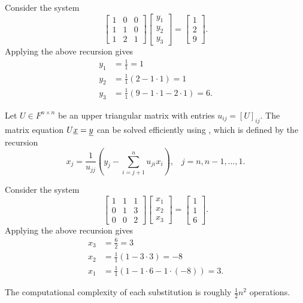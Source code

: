\begin{example}
Consider the system
\begin{equation*}
\left[ \begin{array}{ccc} 1 & 0 & 0 \\ 1 & 1 & 0 \\ 1 & 2 & 1 \end{array} \right]
\left[ \begin{array}{c} y_1 \\ y_2 \\ y_3 \end{array} \right]
 = \left[ \begin{array}{c} 1 \\ 2 \\ 9 \end{array} \right].
\end{equation*}
Applying the above recursion gives
\begin{align*}
y_1 & = \frac{1}{1}  = 1 \\
y_2 & = \frac{1}{1} (2 - 1\cdot 1)  = 1 \\
y_3 & = \frac{1}{1} (9 - 1\cdot 1 - 2\cdot 1) = 6.
\end{align*}
\end{example}

Let $U \in F^{n \times n}$ be an upper triangular matrix with entries $u_{ij} = [ U ]_{ij}$.
The matrix equation $U \underline{x} = \underline{y}$ can be solved efficiently using , which is defined by the recursion
\begin{equation*}
x_j = \frac{1}{u_{jj}} \left( y_j - \sum_{i=j+1}^{n} u_{ji} x_i \right), \;\;\; j=n,n-1,\ldots,1.
\end{equation*}

\begin{example}
Consider the system
\begin{equation*}
\left[ \begin{array}{ccc} 1 & 1 & 1 \\ 0 & 1 & 3 \\ 0 & 0 & 2 \end{array} \right]
\left[ \begin{array}{c} x_1 \\ x_2 \\ x_3 \end{array} \right]
 = \left[ \begin{array}{c} 1 \\ 1 \\ 6 \end{array} \right].
\end{equation*}
Applying the above recursion gives
\begin{align*}
x_3 & = \frac{6}{2} = 3 \\
x_2 & = \frac{1}{1} (1 - 3\cdot 3) = -8 \\
x_1 & = \frac{1}{1} (1 - 1\cdot 6 - 1\cdot (-8) ) = 3. 
\end{align*}
\end{example}
The computational complexity of each substitution is roughly $\frac{1}{2} n^2$ operations.


